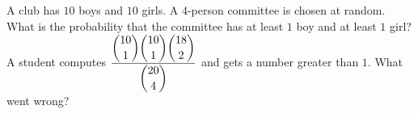 A club has $10$ boys and $10$ girls. A $4$-person committee is chosen at random. What is the probability that the committee has at least $1$ boy and at least $1$ girl? A student computes $\dfrac{\dbinom{10}{1}\dbinom{10}{1}\dbinom{18}{2}}{\dbinom{20}{4}}$ and gets a number greater than $1$. What went wrong?
